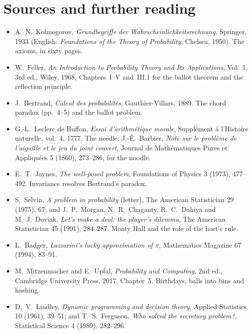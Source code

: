 \section*{Sources and further reading}

\begin{itemize}
\item A.~N.~Kolmogorov, \emph{Grundbegriffe der Wahrscheinlichkeitsrechnung}, Springer, 1933 (English:
\emph{Foundations of the Theory of Probability}, Chelsea, 1950). The axioms, in sixty pages.
\item W.~Feller, \emph{An Introduction to Probability Theory and Its Applications}, Vol.~1, 3rd ed., Wiley, 1968,
Chapters~I--V and~III.1 for the ballot theorem and the reflection principle.
\item J.~Bertrand, \emph{Calcul des probabilités}, Gauthier-Villars, 1889. The chord paradox (pp.~4--5) and the
ballot problem.
\item G.-L.~Leclerc de Buffon, \emph{Essai d'arithmétique morale}, Supplément à l'Histoire naturelle, vol.~4, 1777.
The needle; J.-É.~Barbier, \emph{Note sur le problème de l'aiguille et le jeu du joint couvert}, Journal de
Mathématiques Pures et Appliquées 5 (1860), 273--286, for the noodle.
\item E.~T.~Jaynes, \emph{The well-posed problem}, Foundations of Physics 3 (1973), 477--492. Invariance resolves
Bertrand's paradox.
\item S.~Selvin, \emph{A problem in probability} (letter), The American Statistician 29 (1975), 67; and
J.~P.~Morgan, N.~R.~Chaganty, R.~C.~Dahiya and M.~J.~Doviak, \emph{Let's make a deal: the player's dilemma},
The American Statistician 45 (1991), 284--287. Monty Hall and the role of the host's rule.
\item L.~Badger, \emph{Lazzarini's lucky approximation of $\pi$}, Mathematics Magazine 67 (1994), 83--91.
\item M.~Mitzenmacher and E.~Upfal, \emph{Probability and Computing}, 2nd ed., Cambridge University Press, 2017,
Chapter~5. Birthdays, balls into bins and hashing.
\item D.~V.~Lindley, \emph{Dynamic programming and decision theory}, Applied Statistics 10 (1961), 39--51; and
T.~S.~Ferguson, \emph{Who solved the secretary problem?}, Statistical Science 4 (1989), 282--296.
\end{itemize}
